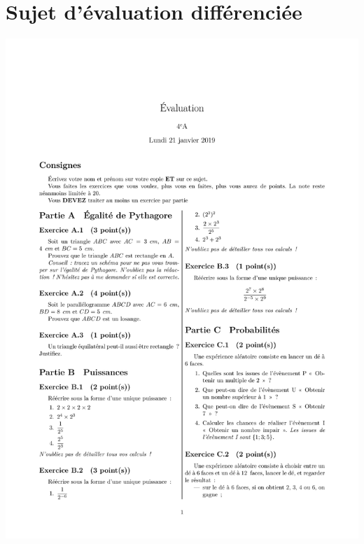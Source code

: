\section{Sujet d'évaluation différenciée}\label{sujet_differencie}
\begin{center}
    \includegraphics[scale=0.2]{annexes/sujet_differencie0.png}

\end{center}
